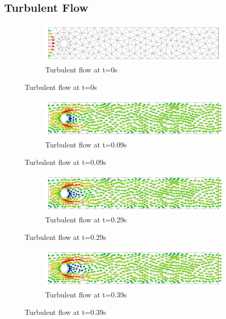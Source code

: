 \subsection{Turbulent Flow}
\begin{figure}[H]
	\centering
	\begin{subfigure}{\textwidth}
   	 	\includegraphics[width=\textwidth]{Figures/numerical_results/turbulent_gpu/turbulent_velocity_field_0.svg.pdf}
    		\caption{Turbulent flow at t=0s}
    \end{subfigure}
\end{figure}

\begin{figure}[H]
	\ContinuedFloat
	\begin{subfigure}{\textwidth}
    \includegraphics[width=\textwidth]{Figures/numerical_results/turbulent_gpu/turbulent_velocity_field_19.svg.pdf}
    \caption{Turbulent flow at t=0.09s}
        \end{subfigure}
\end{figure}

\begin{figure}[H]
	\ContinuedFloat
	\begin{subfigure}{\textwidth}
    \includegraphics[width=\textwidth]{Figures/numerical_results/turbulent_gpu/turbulent_velocity_field_29.svg.pdf}
    \caption{Turbulent flow at t=0.29s}
        \end{subfigure}
\end{figure}

\begin{figure}[H]
	\ContinuedFloat
	\begin{subfigure}{\textwidth}
    \includegraphics[width=\textwidth]{Figures/numerical_results/turbulent_gpu/turbulent_velocity_field_39.svg.pdf}
    \caption{Turbulent flow at t=0.39s}
        \end{subfigure}
\end{figure}

